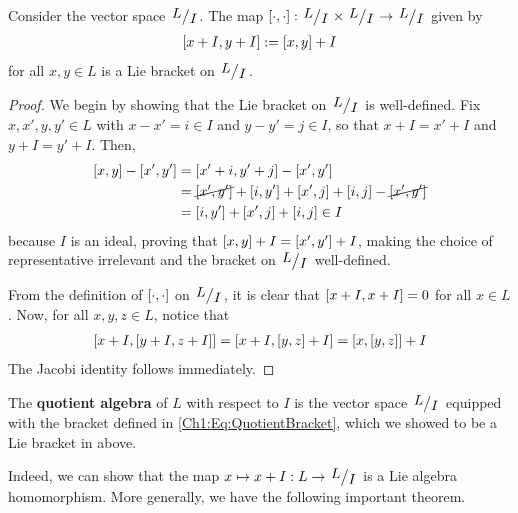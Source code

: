 \begin{boxproposition}\label{Ch1:Prop:QuotientAlgebraLieBracket}
    Consider the vector space $\quotient{L}{I}$. The map $\liebrac : \quotient{L}{I} \times \quotient{L}{I} \to \quotient{L}{I}$ given by
    \begin{align}
        \left[ x + I, y + I \right] := \left[ x, y \right] + I
        \label{Ch1:Eq:QuotientBracket}
    \end{align}
    for all $x, y \in L$ is a Lie bracket on $\quotient{L}{I}$.
\end{boxproposition}
\begin{proof}
    We begin by showing that the Lie bracket on $\quotient{L}{I}$ is well-defined. Fix $x, x', y, y' \in L$ with $x - x' = i \in I$ and $y - y' = j \in I$, so that $x + I = x' + I$ and $y + I = y' + I$. Then,
    \begin{align*}
        \left[ x, y \right] - \left[ x', y' \right]
        &= \left[ x' + i, y' + j \right] - \left[ x', y' \right] \\
        &= \cancel{\left[ x', y' \right]} + \left[ i, y' \right] + \left[ x', j \right] + \left[ i, j \right] - \cancel{\left[ x', y' \right]} \\
        &= \left[ i, y' \right] + \left[ x', j \right] + \left[ i, j \right] \in I
    \end{align*}
    because $I$ is an ideal, proving that $\left[ x, y \right] + I = \left[ x', y' \right] + I$, making the choice of representative irrelevant and the bracket on $\quotient{L}{I}$ well-defined.

    From the definition of $\left[ \cdot, \cdot \right]$ on $\quotient{L}{I}$, it is clear that $\left[ x + I, x + I \right] = 0$ for all $x \in L$. Now, for all $x, y, z \in L$, notice that
    \begin{align*}
        \left[ x + I, \left[ y + I, z + I \right] \right] = \left[ x + I, \left[ y, z \right] + I \right] = \left[ x, \left[ y, z \right] \right] + I
    \end{align*}
    The Jacobi identity follows immediately.
\end{proof}

\begin{boxdefinition}
    The \textbf{quotient algebra} of $L$ with respect to $I$ is the vector space $\quotient{L}{I}$ equipped with the bracket defined in \eqref{Ch1:Eq:QuotientBracket}, which we showed to be a Lie bracket in  above.
\end{boxdefinition}

Indeed, we can show that the map $x \mapsto x + I : L \to \quotient{L}{I}$ is a Lie algebra homomorphism. More generally, we have the following important theorem.

